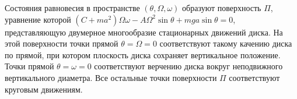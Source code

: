 Состояния равновесия в пространстве $(\theta, \Omega, \omega)$ образуют
поверхность $\Pi$, уравнение которой
$(C + ma^2)\Omega\omega - A\Omega ^2\sin{\theta} + mga\sin{\theta} = 0$,
представляющую двумерное многообразие стационарных движений диска.
На этой поверхности точки прямой $\theta = \Omega = 0$ соответствуют
такому качению диска по прямой, при котором плоскость диска сохраняет
вертикальное положение.
Точки прямой $\theta = \omega = 0$ соответствуют верчению диска вокруг
неподвижного вертикального диаметра.
Все остальные точки поверхности $\Pi$ соответствуют круговым движениям.

